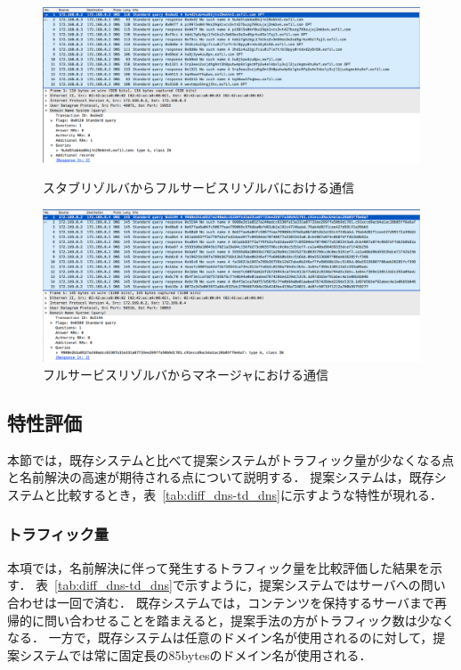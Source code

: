 \begin{figure}[p]
 \centering
 \includegraphics[width=14.5cm]{figure/stab-fullservice.png}
 \vspace{-1cm}
 \caption{スタブリゾルバからフルサービスリゾルバにおける通信}
 \label{fig:stab-fullservice}
 \vspace{1cm}
 \includegraphics[width=14.5cm]{figure/fullresolver-manager.png}
 \vspace{-1cm}
 \caption{フルサービスリゾルバからマネージャにおける通信}
 \label{fig:fullservice-manager}
\end{figure}

\newpage
\subsection{特性評価}
本節では，既存システムと比べて提案システムがトラフィック量が少なくなる点と名前解決の高速が期待される点について説明する．
提案システムは，既存システムと比較するとき，表~\ref{tab:diff_dns-td_dns}に示すような特性が現れる．


\subsubsection{トラフィック量}
本項では，名前解決に伴って発生するトラフィック量を比較評価した結果を示す．
表~\ref{tab:diff_dns-td_dns}で示すように，提案システムではサーバへの問い合わせは一回で済む．
既存システムでは，コンテンツを保持するサーバまで再帰的に問い合わせることを踏まえると，提案手法の方がトラフィック数は少なくなる．
一方で，既存システムは任意のドメイン名が使用されるのに対して，提案システムでは常に固定長の85bytesのドメイン名が使用される．

